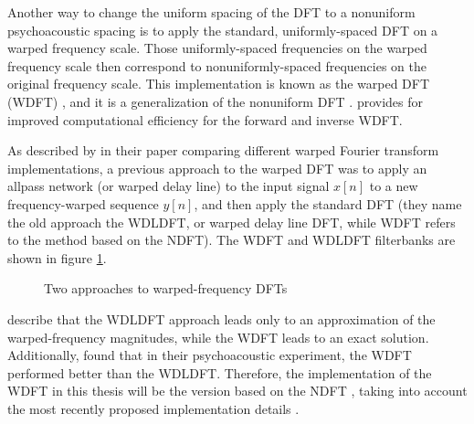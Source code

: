 \documentclass[letter,12pt,notitlepage]{article}
\begin{document}
Another way to change the uniform spacing of the DFT to a nonuniform psychoacoustic spacing is to apply the standard, uniformly-spaced DFT on a warped frequency scale. Those uniformly-spaced frequencies on the warped frequency scale then correspond to nonuniformly-spaced frequencies on the original frequency scale. This implementation is known as the warped DFT (WDFT) \cite{warped1}, and it is a generalization of the nonuniform DFT \cite{nufft3}. \citet{warped2} provides for improved computational efficiency for the forward and inverse WDFT.

As described by \citet{warpedcomparison} in their paper comparing different warped Fourier transform implementations, a previous approach to the warped DFT \cite{earlywarped1, earlywarped2} was to apply an allpass network (or warped delay line) to the input signal $x[n]$ to a new frequency-warped sequence $y[n]$, and then apply the standard DFT (they name the old approach the WDLDFT, or warped delay line DFT, while WDFT refers to the method based on the NDFT). The WDFT and WDLDFT filterbanks are shown in figure \ref{fig:wdfts}.

\begin{figure}[ht]
	\centering
	\caption{Two approaches to warped-frequency DFTs}
	\label{fig:wdfts}
\end{figure}

\citet{warped1} describe that the WDLDFT approach leads only to an approximation of the warped-frequency magnitudes, while the WDFT leads to an exact solution. Additionally, \citet{warpedcomparison} found that in their psychoacoustic experiment, the WDFT performed better than the WDLDFT. Therefore, the implementation of the WDFT in this thesis will be the version based on the NDFT \cite{warped1}, taking into account the most recently proposed implementation details \cite{warped2}.
\end{document}
